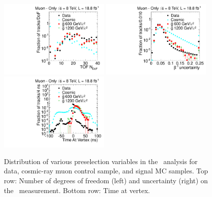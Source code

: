 \begin{figure}
\centering
  \includegraphics[clip=false, trim=0.0cm 0cm 0.0cm 0cm, width=0.48\textwidth]{figures/muonly/Selection_Comp_8TeV_Cosmic_nDof_BS}
  \includegraphics[clip=false, trim=0.0cm 0cm 0.0cm 0cm, width=0.48\textwidth]{figures/muonly/Selection_Comp_8TeV_Cosmic_TOFError_BS} \\
  \includegraphics[clip=false, trim=0.0cm 0cm 0.0cm 0cm, width=0.48\textwidth]{figures/muonly/Selection_Comp_8TeV_Cosmic_TimeAtIP_BS} \\
\caption[Distribution of number of degrees of freedom (left) and uncertainty (right) on the \invbeta\ measurement and time at vertex in 
the \muononly\ analysis for data, cosmic-ray muon control sample, and signal MC samples.]
{Distribution of various preselection variables in the \muononly\ analysis for data, cosmic-ray muon control sample, and signal MC samples.
Top row: Number of degrees of freedom (left) and uncertainty (right) on the \invbeta\ measurement.
Bottom row: Time at vertex.}
    \label{fig:MuOnlyPreselB}
\end{figure}

